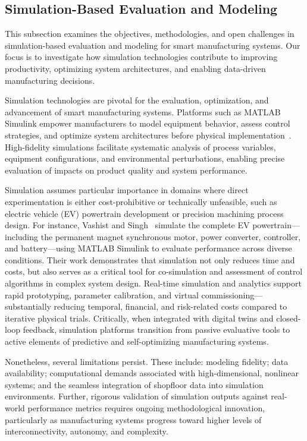 \documentclass[sigconf]{acmart}
\begin{document}
\subsection{Simulation-Based Evaluation and Modeling}

This subsection examines the objectives, methodologies, and open challenges in simulation-based evaluation and modeling for smart manufacturing systems. Our focus is to investigate how simulation technologies contribute to improving productivity, optimizing system architectures, and enabling data-driven manufacturing decisions.

Simulation technologies are pivotal for the evaluation, optimization, and advancement of smart manufacturing systems. Platforms such as MATLAB Simulink empower manufacturers to model equipment behavior, assess control strategies, and optimize system architectures before physical implementation~\cite{ref95}. High-fidelity simulations facilitate systematic analysis of process variables, equipment configurations, and environmental perturbations, enabling precise evaluation of impacts on product quality and system performance.

Simulation assumes particular importance in domains where direct experimentation is either cost-prohibitive or technically unfeasible, such as electric vehicle (EV) powertrain development or precision machining process design. For instance, Vashist and Singh~\cite{ref95} simulate the complete EV powertrain—including the permanent magnet synchronous motor, power converter, controller, and battery—using MATLAB Simulink to evaluate performance across diverse conditions. Their work demonstrates that simulation not only reduces time and costs, but also serves as a critical tool for co-simulation and assessment of control algorithms in complex system design. Real-time simulation and analytics support rapid prototyping, parameter calibration, and virtual commissioning—substantially reducing temporal, financial, and risk-related costs compared to iterative physical trials. Critically, when integrated with digital twins and closed-loop feedback, simulation platforms transition from passive evaluative tools to active elements of predictive and self-optimizing manufacturing systems.

Nonetheless, several limitations persist. These include: modeling fidelity; data availability; computational demands associated with high-dimensional, nonlinear systems; and the seamless integration of shopfloor data into simulation environments. Further, rigorous validation of simulation outputs against real-world performance metrics requires ongoing methodological innovation, particularly as manufacturing systems progress toward higher levels of interconnectivity, autonomy, and complexity.
\end{document}
